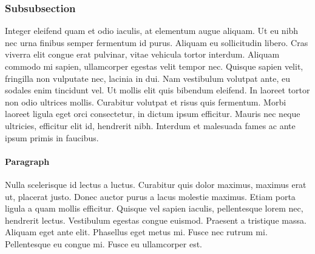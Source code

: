 \documentclass[10pt,sigconf]{acmart}
\begin{document}
\subsubsection{Subsubsection}

Integer eleifend quam et odio iaculis, at elementum augue aliquam.
Ut eu nibh nec urna finibus semper fermentum id purus.
Aliquam eu sollicitudin libero.
Cras viverra elit congue erat pulvinar, vitae vehicula tortor interdum.
Aliquam commodo mi sapien, ullamcorper egestas velit tempor nec.
Quisque sapien velit, fringilla non vulputate nec, lacinia in dui.
Nam vestibulum volutpat ante, eu sodales enim tincidunt vel.
Ut mollis elit quis bibendum eleifend.
In laoreet tortor non odio ultrices mollis.
Curabitur volutpat et risus quis fermentum.
Morbi laoreet ligula eget orci consectetur, in dictum ipsum efficitur.
Mauris nec neque ultricies, efficitur elit id, hendrerit nibh.
Interdum et malesuada fames ac ante ipsum primis in faucibus.



\paragraph{Paragraph}

Nulla scelerisque id lectus a luctus.
Curabitur quis dolor maximus, maximus erat ut, placerat justo.
Donec auctor purus a lacus molestie maximus.
Etiam porta ligula a quam mollis efficitur.
Quisque vel sapien iaculis, pellentesque lorem nec, hendrerit lectus.
Vestibulum egestas congue euismod.
Praesent a tristique massa.
Aliquam eget ante elit.
Phasellus eget metus mi.
Fusce nec rutrum mi.
Pellentesque eu congue mi.
Fusce eu ullamcorper est.



 
\end{document}
